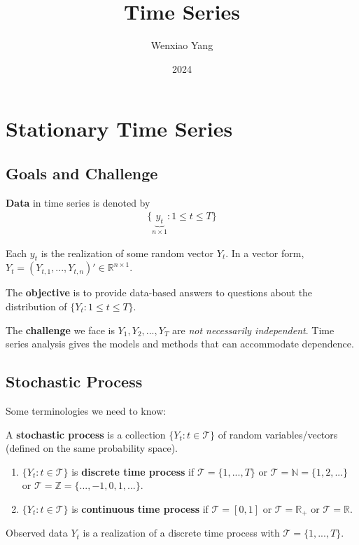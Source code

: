 \documentclass[11pt]{elegantbook}
\title{Time Series}
\author{Wenxiao Yang}
\institute{Haas School of Business, University of California Berkeley}
\date{2024}
\begin{document}
\maketitle

\frontmatter
\tableofcontents

\mainmatter

\chapter{Stationary Time Series}
\section{Goals and Challenge}
\textbf{Data} in time series is denoted by
\begin{equation}
    \begin{aligned}
        \{\underbrace{y_t}_{n\times 1}:1\leq t\leq T\}
    \end{aligned}
    \nonumber
\end{equation}
\begin{assumption}
    Each $y_t$ is the realization of some random vector $Y_t$. In a vector form, $Y_t=\left(Y_{t,1},...,Y_{t,n}\right)'\in \mathbb{R}^{n\times 1}$.
\end{assumption}
The \textbf{objective} is to provide data-based answers to questions about the distribution of $\{Y_t:1\leq t\leq T\}$.

The \textbf{challenge} we face is $Y_1,Y_2,...,Y_T$ are \textit{not necessarily independent}. Time series analysis gives the models and methods that can accommodate dependence.

\section{Stochastic Process}
Some terminologies we need to know:
\begin{definition}
    A \textbf{stochastic process} is a collection $\{Y_t:t\in\mathcal{T}\}$ of random variables/vectors (defined on the same probability space).
    \begin{enumerate}
        \item $\{Y_t:t\in\mathcal{T}\}$ is \textbf{discrete time process} if $\mathcal{T}=\{1,...,T\}$ or $\mathcal{T}=\mathbb{N}=\{1,2,...\}$ or $\mathcal{T}=\mathbb{Z}=\{...,-1,0,1,...\}$.
        \item $\{Y_t:t\in\mathcal{T}\}$ is \textbf{continuous time process} if $\mathcal{T}=[0,1]$ or $\mathcal{T}=\mathbb{R}_+$ or $\mathcal{T}=\mathbb{R}$.
    \end{enumerate}
\end{definition}
Observed data $Y_t$ is a realization of a discrete time process with $\mathcal{T}=\{1,...,T\}$.
\end{document}
